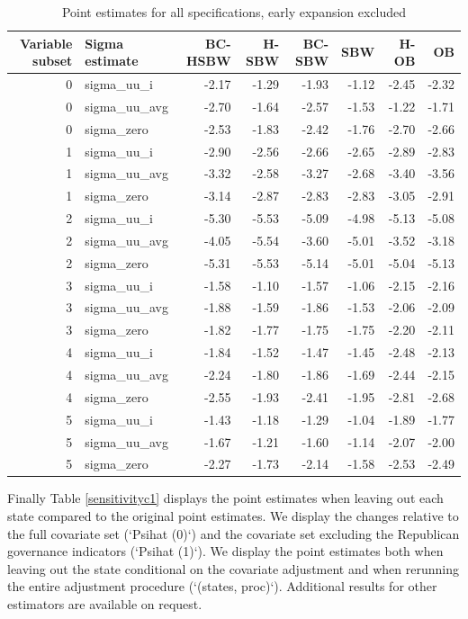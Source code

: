 \documentclass[12pt]{article}
\begin{document}
\begin{table}[ht]
\begin{tabular}{rlrrrrrr}
  \toprule
Variable subset & Sigma estimate & BC-HSBW & H-SBW & BC-SBW & SBW & H-OB & OB \\ 
  \midrule
0 & sigma\_uu\_i & -2.17 & -1.29 & -1.93 & -1.12 & -2.45 & -2.32 \\ 
  0 & sigma\_uu\_avg & -2.70 & -1.64 & -2.57 & -1.53 & -1.22 & -1.71 \\ 
  0 & sigma\_zero & -2.53 & -1.83 & -2.42 & -1.76 & -2.70 & -2.66 \\ 
  1 & sigma\_uu\_i & -2.90 & -2.56 & -2.66 & -2.65 & -2.89 & -2.83 \\ 
  1 & sigma\_uu\_avg & -3.32 & -2.58 & -3.27 & -2.68 & -3.40 & -3.56 \\ 
  1 & sigma\_zero & -3.14 & -2.87 & -2.83 & -2.83 & -3.05 & -2.91 \\ 
  2 & sigma\_uu\_i & -5.30 & -5.53 & -5.09 & -4.98 & -5.13 & -5.08 \\ 
  2 & sigma\_uu\_avg & -4.05 & -5.54 & -3.60 & -5.01 & -3.52 & -3.18 \\ 
  2 & sigma\_zero & -5.31 & -5.53 & -5.14 & -5.01 & -5.04 & -5.13 \\ 
  3 & sigma\_uu\_i & -1.58 & -1.10 & -1.57 & -1.06 & -2.15 & -2.16 \\ 
  3 & sigma\_uu\_avg & -1.88 & -1.59 & -1.86 & -1.53 & -2.06 & -2.09 \\ 
  3 & sigma\_zero & -1.82 & -1.77 & -1.75 & -1.75 & -2.20 & -2.11 \\ 
  4 & sigma\_uu\_i & -1.84 & -1.52 & -1.47 & -1.45 & -2.48 & -2.13 \\ 
  4 & sigma\_uu\_avg & -2.24 & -1.80 & -1.86 & -1.69 & -2.44 & -2.15 \\ 
  4 & sigma\_zero & -2.55 & -1.93 & -2.41 & -1.95 & -2.81 & -2.68 \\ 
  5 & sigma\_uu\_i & -1.43 & -1.18 & -1.29 & -1.04 & -1.89 & -1.77 \\ 
  5 & sigma\_uu\_avg & -1.67 & -1.21 & -1.60 & -1.14 & -2.07 & -2.00 \\ 
  5 & sigma\_zero & -2.27 & -1.73 & -2.14 & -1.58 & -2.53 & -2.49 \\ 
   \bottomrule
\end{tabular}
   \label{pointesttablec2}
   \caption{Point estimates for all specifications, early expansion excluded}
\end{table}

Finally Table \ref{sensitivityc1} displays the point estimates when leaving out each state compared to the original point estimates. We display the changes relative to the full covariate set (`Psihat (0)`) and the covariate set excluding the Republican governance indicators (`Psihat (1)`). We display the point estimates both when leaving out the state conditional on the covariate adjustment and when rerunning the entire adjustment procedure (`(states, proc)`). Additional results for other estimators are available on request.
\end{document}
